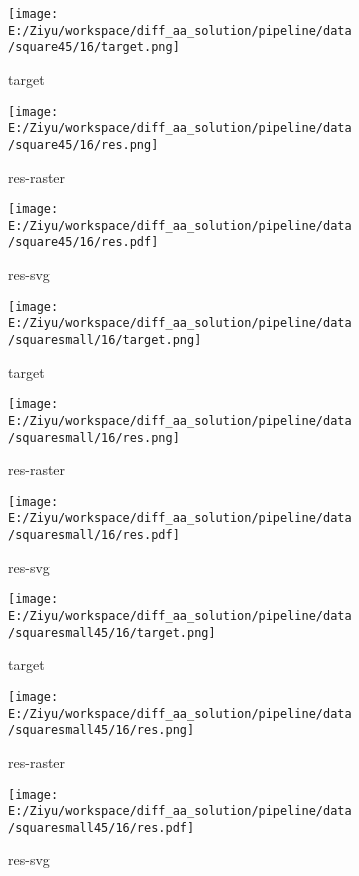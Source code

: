 \documentclass{article}%
\begin{document}
%


\begin{figure}[H]%
\begin{subfigure}[b]{0.32\linewidth}%
\texttt{[image: E:/Ziyu/workspace/diff\_aa\_solution/pipeline/data/square45/16/target.png]}%
\caption{target}%
\end{subfigure}%
\begin{subfigure}[b]{0.32\linewidth}%
\texttt{[image: E:/Ziyu/workspace/diff\_aa\_solution/pipeline/data/square45/16/res.png]}%
\caption{res{-}raster}%
\end{subfigure}%
\begin{subfigure}[b]{0.32\linewidth}%
\texttt{[image: E:/Ziyu/workspace/diff\_aa\_solution/pipeline/data/square45/16/res.pdf]}%
\caption{res{-}svg}%
\end{subfigure}%
\par\vspace{1em}%
\caption{}%
\clearpage%
\end{figure}

%


\begin{figure}[H]%
\begin{subfigure}[b]{0.32\linewidth}%
\texttt{[image: E:/Ziyu/workspace/diff\_aa\_solution/pipeline/data/squaresmall/16/target.png]}%
\caption{target}%
\end{subfigure}%
\begin{subfigure}[b]{0.32\linewidth}%
\texttt{[image: E:/Ziyu/workspace/diff\_aa\_solution/pipeline/data/squaresmall/16/res.png]}%
\caption{res{-}raster}%
\end{subfigure}%
\begin{subfigure}[b]{0.32\linewidth}%
\texttt{[image: E:/Ziyu/workspace/diff\_aa\_solution/pipeline/data/squaresmall/16/res.pdf]}%
\caption{res{-}svg}%
\end{subfigure}%
\par\vspace{1em}%
\caption{}%
\end{figure}

%


\begin{figure}[H]%
\begin{subfigure}[b]{0.32\linewidth}%
\texttt{[image: E:/Ziyu/workspace/diff\_aa\_solution/pipeline/data/squaresmall45/16/target.png]}%
\caption{target}%
\end{subfigure}%
\begin{subfigure}[b]{0.32\linewidth}%
\texttt{[image: E:/Ziyu/workspace/diff\_aa\_solution/pipeline/data/squaresmall45/16/res.png]}%
\caption{res{-}raster}%
\end{subfigure}%
\begin{subfigure}[b]{0.32\linewidth}%
\texttt{[image: E:/Ziyu/workspace/diff\_aa\_solution/pipeline/data/squaresmall45/16/res.pdf]}%
\caption{res{-}svg}%
\end{subfigure}%
\par\vspace{1em}%
\caption{}%
\end{figure}
\end{document}
